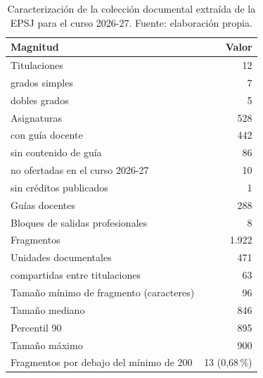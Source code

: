 \begin{table}[htbp]
  \centering
  \caption[Caracterización de la colección documental]{Caracterización de la colección documental extraída de la EPSJ para el curso 2026-27. Fuente: elaboración propia.}
  \label{tab:caracterizacion_corpus}
  \small
  \begin{tabular}{@{}l r@{}}
    \toprule
    \textbf{Magnitud}                              & \textbf{Valor}           \\
    \midrule
    Titulaciones                                   & 12                       \\
    \quad grados simples                           & 7                        \\
    \quad dobles grados                            & 5                        \\
    \midrule
    Asignaturas                                    & 528                      \\
    \quad con guía docente                         & 442                      \\
    \quad sin contenido de guía                    & 86                       \\
    \quad no ofertadas en el curso 2026-27                & 10                       \\
    \quad sin créditos publicados                  & 1                        \\
    \midrule
    Guías docentes                                 & 288                      \\
    Bloques de salidas profesionales               & 8                        \\
    \midrule
    Fragmentos                                     & 1.922 \\
    Unidades documentales                          & 471 \\
    \quad compartidas entre titulaciones           & 63 \\
    \midrule
    Tamaño mínimo de fragmento (caracteres)        & 96                       \\
    Tamaño mediano                                 & 846 \\
    Percentil 90                                   & 895                      \\
    Tamaño máximo                                  & 900                      \\
    Fragmentos por debajo del mínimo de 200        & 13 (0,68\,\%) \\

\end{tabular}
\end{table}
